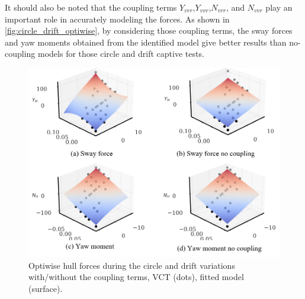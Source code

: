 It should also be noted that the coupling terms $Y_{vrr}$,$Y_{vvr}$,$N_{vrr}$, and $N_{vvr}$ play an important role in accurately modeling the forces. As shown in \autoref{fig:circle_drift_optiwise}, by considering those coupling terms, the sway forces and yaw moments obtained from the identified model give better results than no-coupling models for those circle and drift captive tests.

\begin{figure}[ht]
    \centering
    \includegraphics[width=0.8\linewidth]{figures/results_optiwise_vct.YNH.png}
    \caption{Optiwise hull forces during the circle and drift variations with/without the coupling terms, VCT (dots), fitted model (surface).}
    \label{fig:circle_drift_optiwise}
\end{figure}


%          
     
%          
%          
     

